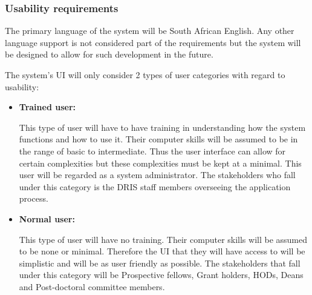 \documentclass[12pt]{article}
\begin{document}
		\subsubsection{Usability requirements}
		
		\begin{flushleft}
		
		The primary language of the system will be South African English. Any other language support is not considered part of the requirements but the system will be designed to allow for such development in the future.\\
		
		\vspace{0.1in}
				
		The system's UI will only consider 2 types of user categories with regard to usability:
		
		\begin{itemize}
		
		\item\textbf{Trained user:}
		
		This type of user will have to have training in understanding how the system functions and how to use it. Their computer skills will be assumed to be in the range of basic to intermediate. Thus the user interface can allow for certain complexities but these complexities must be kept at a minimal. This user will be regarded as a system administrator.  The stakeholders who fall under this category is the DRIS staff members overseeing the application process.
		
		\item\textbf{Normal user:}
		
		This type of user will have no training. Their computer skills will be assumed to be none or minimal. Therefore the UI that they will have access to will be simplistic and will be as user friendly as possible. The stakeholders that fall under this category will be Prospective fellows, Grant holders, HODs, Deans and Post-doctoral committee members.
		
		\end{itemize}
		
		\end{flushleft}
		
		\vspace{0.2in}	
		
		
\end{document}
